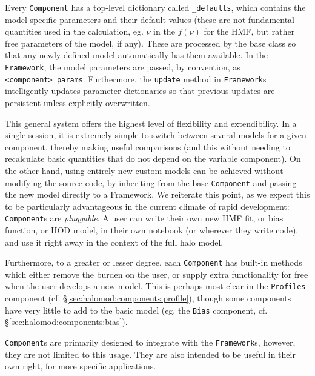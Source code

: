 \documentclass[5p]{elsarticle}
\begin{document}
Every \verb|Component| has a top-level dictionary called \verb|_defaults|, which contains the model-specific parameters and their default values (these are not fundamental quantities used in the calculation, eg. $\nu$ in the $f(\nu)$ for the HMF, but rather free parameters of the model, if any). These are processed by the base class so that any newly defined model automatically has them available. In the \verb|Framework|, the model parameters are passed, by convention, as \verb|<component>_params|. Furthermore, the \verb|update| method in \verb|Framework|s intelligently updates parameter dictionaries so that previous updates are persistent unless explicitly overwritten.

This general system offers the highest level of flexibility and extendibility. In a single session, it is extremely simple to switch between several models for a given component, thereby making useful comparisons (and this without needing to recalculate basic quantities that do not depend on the variable component). On the other hand, using entirely new custom models can be achieved without modifying the source code, by inheriting from the base \verb|Component| and passing the new model directly to a Framework. We reiterate this point, as we expect this to be particularly advantageous in the current climate of rapid development: \verb|Component|s are \textit{pluggable}. A user can write their own new HMF fit, or bias function, or HOD model, in their own notebook (or wherever they write code), and use it right away in the context of the full halo model. 

Furthermore, to a greater or lesser degree, each \verb|Component| has built-in methods which either remove the burden on the user, or supply extra functionality for free when the user develops a new model. This is perhaps most clear in the \verb|Profiles| component (cf. \S\ref{sec:halomod:components:profile}), though some components have very little to add to the basic model (eg. the \verb|Bias| component, cf. \S\ref{sec:halomod:components:bias}). 

\verb|Component|s are primarily designed to integrate with the \verb|Framework|s, however, they are not limited to this usage. They are also intended to be useful in their own right, for more specific applications. 

\end{document}
